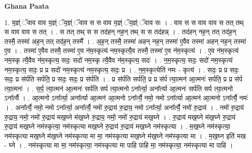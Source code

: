 \documentclass[17pt]{extarticle}
\begin{document}
\textbf{Ghana Paata } \newline

1. य॒ज्ञ्ं ॅवाव वाव य॒ज्ञ्ं ॅय॒ज्ञ्ं ॅवाव स स वाव य॒ज्ञ्ं ॅय॒ज्ञ्ं ॅवाव सः । . वाव स स वाव वाव स तत् तथ् स वाव वाव स तत् । . स तत् तथ् स स तद॑हन् नह॒न् तथ् स स तद॑हन्न् । . तद॑हन् नह॒न् तत् तद॑ह॒न् तस्मै॒ तस्मा॑ अह॒न् तत् तद॑ह॒न् तस्मै᳚ । . अ॒ह॒न् तस्मै॒ तस्मा॑ अहन् नह॒न् तस्मा॑ ए॒वैव तस्मा॑ अहन् नह॒न् तस्मा॑ ए॒व । . तस्मा॑ ए॒वैव तस्मै॒ तस्मा॑ ए॒व न॑म॒स्कृत्य॑ नम॒स्कृत्यै॒व तस्मै॒ तस्मा॑ ए॒व न॑म॒स्कृत्य॑ । . ए॒व न॑म॒स्कृत्य॑ नम॒स्कृ त्यै॒वैव न॑म॒स्कृत्य॒ सदः॒ सदो॑ नम॒स्कृ त्यै॒वैव न॑म॒स्कृत्य॒ सदः॑ । . न॒म॒स्कृत्य॒ सदः॒ सदो॑ नम॒स्कृत्य॑ नम॒स्कृत्य॒ सदः॒ प्र प्र सदो॑ नम॒स्कृत्य॑ नम॒स्कृत्य॒ सदः॒ प्र । . न॒म॒स्कृत्येति॑ नमः - कृत्य॑ । . सदः॒ प्र प्र सदः॒ सदः॒ प्र स॑र्पति सर्पति॒ प्र सदः॒ सदः॒ प्र स॑र्पति । . प्र स॑र्पति सर्पति॒ प्र प्र स॑र्प त्या॒त्मन॑ आ॒त्मनः॑ सर्पति॒ प्र प्र स॑र्प त्या॒त्मनः॑ । . स॒र्प॒ त्या॒त्मन॑ आ॒त्मनः॑ सर्पति सर्प त्या॒त्मनो ऽना᳚र्त्या॒ अना᳚र्त्या आ॒त्मनः॑ सर्पति सर्प त्या॒त्मनो ऽना᳚र्त्यै । . आ॒त्मनो ऽना᳚र्त्या॒ अना᳚र्त्या आ॒त्मन॑ आ॒त्मनो ऽना᳚र्त्यै॒ नमो॒ नमो ऽना᳚र्त्या आ॒त्मन॑ आ॒त्मनो ऽना᳚र्त्यै॒ नमः॑ । . अना᳚र्त्यै॒ नमो॒ नमो ऽना᳚र्त्या॒ अना᳚र्त्यै॒ नमो॑ रु॒द्राय॑ रु॒द्राय॒ नमो ऽना᳚र्त्या॒ अना᳚र्त्यै॒ नमो॑ रु॒द्राय॑ । . नमो॑ रु॒द्राय॑ रु॒द्राय॒ नमो॒ नमो॑ रु॒द्राय॑ मख॒घ्ने म॑ख॒घ्ने रु॒द्राय॒ नमो॒ नमो॑ रु॒द्राय॑ मख॒घ्ने । . रु॒द्राय॑ मख॒घ्ने म॑ख॒घ्ने रु॒द्राय॑ रु॒द्राय॑ मख॒घ्ने नम॑स्कृत्या॒ नम॑स्कृत्या मख॒घ्ने रु॒द्राय॑ रु॒द्राय॑ मख॒घ्ने नम॑स्कृत्या । . म॒ख॒घ्ने नम॑स्कृत्या॒ नम॑स्कृत्या मख॒घ्ने म॑ख॒घ्ने नम॑स्कृत्या मा मा॒ नम॑स्कृत्या मख॒घ्ने म॑ख॒घ्ने नम॑स्कृत्या मा । . म॒ख॒घ्न इति॑ मख - घ्ने । . नम॑स्कृत्या मा मा॒ नम॑स्कृत्या॒ नम॑स्कृत्या मा पाहि पाहि मा॒ नम॑स्कृत्या॒ नम॑स्कृत्या मा पाहि । \newline
\end{document}
